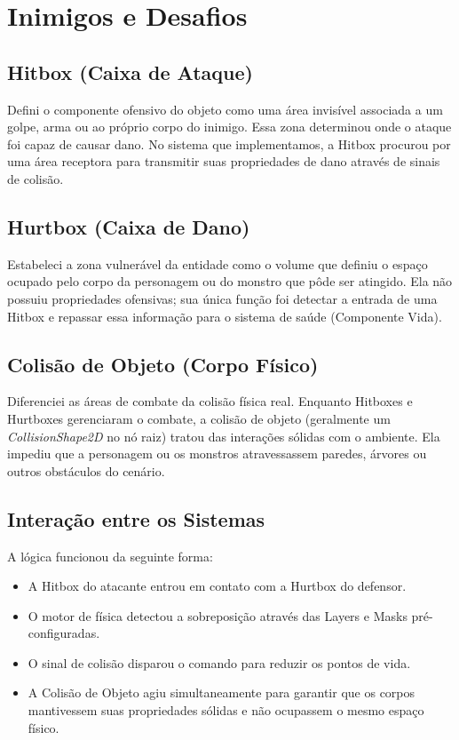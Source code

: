 \documentclass[12pt, a4paper]{article} %
\begin{document}
	
	\section{Inimigos e Desafios}
	
	\subsection{Hitbox (Caixa de Ataque)}
	Defini o componente ofensivo do objeto como uma área invisível associada a um golpe, arma ou ao próprio corpo do inimigo. Essa zona determinou onde o ataque foi capaz de causar dano. No sistema que implementamos, a Hitbox procurou por uma área receptora para transmitir suas propriedades de dano através de sinais de colisão.
	
	\subsection{Hurtbox (Caixa de Dano)}
	Estabeleci a zona vulnerável da entidade como o volume que definiu o espaço ocupado pelo corpo da personagem ou do monstro que pôde ser atingido. Ela não possuiu propriedades ofensivas; sua única função foi detectar a entrada de uma Hitbox e repassar essa informação para o sistema de saúde (Componente Vida).
	
	\subsection{Colisão de Objeto (Corpo Físico)}
	Diferenciei as áreas de combate da colisão física real. Enquanto Hitboxes e Hurtboxes gerenciaram o combate, a colisão de objeto (geralmente um \textit{CollisionShape2D} no nó raiz) tratou das interações sólidas com o ambiente. Ela impediu que a personagem ou os monstros atravessassem paredes, árvores ou outros obstáculos do cenário.
	
	\subsection{Interação entre os Sistemas}
	A lógica funcionou da seguinte forma:
	\begin{itemize}
		\item A Hitbox do atacante entrou em contato com a Hurtbox do defensor.
		\item O motor de física detectou a sobreposição através das Layers e Masks pré-configuradas.
		\item O sinal de colisão disparou o comando para reduzir os pontos de vida.
		\item A Colisão de Objeto agiu simultaneamente para garantir que os corpos mantivessem suas propriedades sólidas e não ocupassem o mesmo espaço físico.
	\end{itemize}
	
\end{document}
